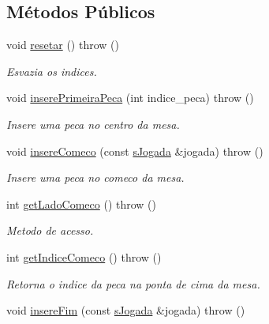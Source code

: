 \subsection*{Métodos Públicos}
\begin{DoxyCompactItemize}
\item 
\hypertarget{classMesa_a2d23aa5398a03ea48bc098dca09742cc}{
void \hyperlink{classMesa_a2d23aa5398a03ea48bc098dca09742cc}{resetar} ()  throw ()}
\label{classMesa_a2d23aa5398a03ea48bc098dca09742cc}

\begin{DoxyCompactList}\small\item\em Esvazia os indices. \item\end{DoxyCompactList}\item 
void \hyperlink{classMesa_a0fc48607f94d1b750d2f83533b8416e7}{inserePrimeiraPeca} (int indice\_\-peca)  throw ()
\begin{DoxyCompactList}\small\item\em Insere uma peca no centro da mesa. \item\end{DoxyCompactList}\item 
void \hyperlink{classMesa_a17e202d50f0f113700169e93d2a6c140}{insereComeco} (const \hyperlink{structsJogada}{sJogada} \&jogada)  throw ()
\begin{DoxyCompactList}\small\item\em Insere uma peca no comeco da mesa. \item\end{DoxyCompactList}\item 
int \hyperlink{classMesa_a5d5a11c6c1b799f037976685b382bd02}{getLadoComeco} ()  throw ()
\begin{DoxyCompactList}\small\item\em Metodo de acesso. \item\end{DoxyCompactList}\item 
int \hyperlink{classMesa_a27977e765ff8e91c684734f68949cd5f}{getIndiceComeco} ()  throw ()
\begin{DoxyCompactList}\small\item\em Retorna o indice da peca na ponta de cima da mesa. \item\end{DoxyCompactList}\item 
void \hyperlink{classMesa_a3630fabd06b3701cef850b1528143d1a}{insereFim} (const \hyperlink{structsJogada}{sJogada} \&jogada)  throw ()

\end{DoxyCompactItemize}
